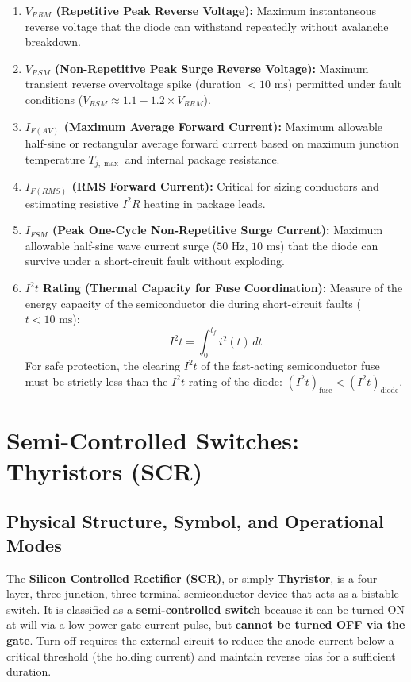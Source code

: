 \documentclass[11pt,a4paper]{article}
\begin{document}
\begin{enumerate}[leftmargin=*]
  \item \textbf{$V_{RRM}$ (Repetitive Peak Reverse Voltage):} Maximum instantaneous reverse voltage that the diode can withstand repeatedly without avalanche breakdown.
  \item \textbf{$V_{RSM}$ (Non-Repetitive Peak Surge Reverse Voltage):} Maximum transient reverse overvoltage spike (duration $< 10\text{ ms}$) permitted under fault conditions ($V_{RSM} \approx 1.1 - 1.2 \times V_{RRM}$).
  \item \textbf{$I_{F(AV)}$ (Maximum Average Forward Current):} Maximum allowable half-sine or rectangular average forward current based on maximum junction temperature $T_{j,\max}$ and internal package resistance.
  \item \textbf{$I_{F(RMS)}$ (RMS Forward Current):} Critical for sizing conductors and estimating resistive $I^2 R$ heating in package leads.
  \item \textbf{$I_{FSM}$ (Peak One-Cycle Non-Repetitive Surge Current):} Maximum allowable half-sine wave current surge ($50\text{ Hz}$, $10\text{ ms}$) that the diode can survive under a short-circuit fault without exploding.
  \item \textbf{$I^2 t$ Rating (Thermal Capacity for Fuse Coordination):} Measure of the energy capacity of the semiconductor die during short-circuit faults ($t < 10\text{ ms}$):
  \begin{equation}
  I^2 t = \int_0^{t_f} i^2(t) \, dt
  \end{equation}
  For safe protection, the clearing $I^2 t$ of the fast-acting semiconductor fuse must be strictly less than the $I^2 t$ rating of the diode: $(I^2 t)_{\text{fuse}} < (I^2 t)_{\text{diode}}$.
\end{enumerate}

\section{Semi-Controlled Switches: Thyristors (SCR)}

\subsection{Physical Structure, Symbol, and Operational Modes}

The \textbf{Silicon Controlled Rectifier (SCR)}, or simply \textbf{Thyristor}, is a four-layer, three-junction, three-terminal semiconductor device that acts as a bistable switch. It is classified as a \textbf{semi-controlled switch} because it can be turned ON at will via a low-power gate current pulse, but \textbf{cannot be turned OFF via the gate}. Turn-off requires the external circuit to reduce the anode current below a critical threshold (the holding current) and maintain reverse bias for a sufficient duration.
\end{document}
